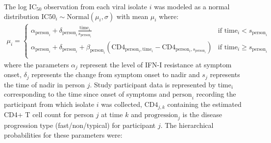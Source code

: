 \documentclass[12pt]{article}
\newcommand{\icFifty}{IC$_{50}$}
\begin{document}
 The log \icFifty{} observation from each viral isolate $i$ was modeled as a normal distribution $\text{IC50}_i\sim\text{Normal}(\mu_i,\sigma)$ with mean $\mu_i$ where:
\begin{align*}
  \mu_i=\begin{cases} 
    \alpha_{\text{person}_i}+\delta_{\text{person}_i}\frac{\text{time}_i}{s_{\text{person}_i}} & \text{if } \text{time}_i<s_{\text{person}_i}\\
    \alpha_{\text{person}_i}+\delta_{\text{person}_i} + \beta_{\text{person}_i}(\text{CD4}_{\text{person$_i$},\text{time}_i}-\text{CD4}_{\text{person$_i$},s_\text{person$_i$}}) & \text{if } \text{time}_i\ge s_{\text{person}_i}\\
  \end{cases}
\end{align*}
where the parameters $\alpha_j$ represent the level of IFN-I resistance at symptom onset, $\delta_j$ represents the change from symptom onset to nadir and $s_j$ represents the time of nadir in person $j$. Study participant data is represented by $\text{time}_i$ corresponding to the time since onset of symptoms and $\text{person}_i$ recording the participant from which isolate $i$ was collected, $\text{CD4}_{j,k}$ containing the estimated CD4+ T cell count for person $j$ at time $k$ and $\text{progression}_j$ is the disease progression type (fast/non/typical) for participant $j$. The hierarchical probabilities for these parameters were:
\end{document}

